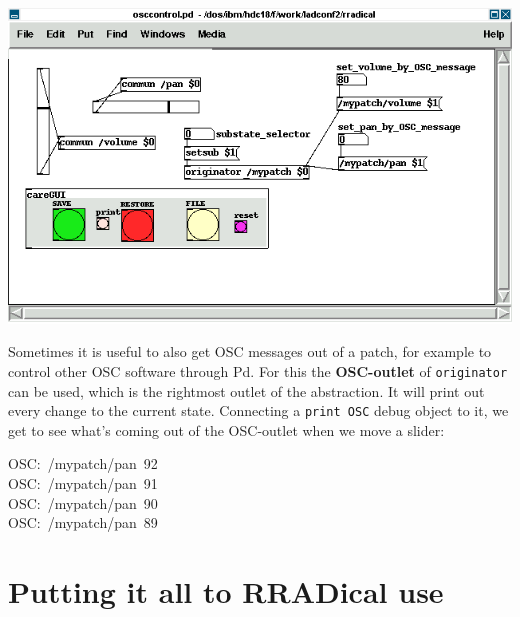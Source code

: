 \documentclass[10pt,english]{scrartcl}
\begin{document}
\includegraphics{osccontrol.png}

Sometimes it is useful to also get OSC messages out of a patch, for example
to control other OSC software through Pd. For this the \textbf{OSC-outlet} of
\texttt{originator} can be used, which is the rightmost outlet of the
abstraction. It will print out every change to the current state.
Connecting a \texttt{print OSC} debug object to it, we get to see what's coming
out of the OSC-outlet when we move a slider:
\begin{ttfamily}\begin{flushleft}
\mbox{OSC:~/mypatch/pan~92}\\
\mbox{OSC:~/mypatch/pan~91}\\
\mbox{OSC:~/mypatch/pan~90}\\
\mbox{OSC:~/mypatch/pan~89}
\end{flushleft}\end{ttfamily}



\hypertarget{putting-it-all-to-rradical-use}{}
\section*{Putting it all to RRADical use}
\end{document}
